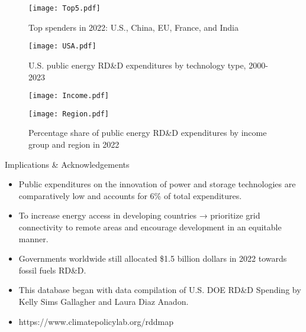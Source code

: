 \documentclass{beamer}
\begin{document}
\begin{frame}
\begin{figure}
    \centering
    \texttt{[image: Top5.pdf]}
    \caption{Top spenders in 2022: U.S., China, EU, France, and India 
}
    \label{fig:enter-label}
\end{figure}
\end{frame}

\begin{frame}
\begin{figure}
    \centering
    \texttt{[image: USA.pdf]}
    \caption{U.S. public energy RD\&D expenditures by technology type, 2000-2023
}
    \label{fig:enter-label}
\end{figure}
\end{frame}

\begin{frame}

\begin{figure}
 \centering
    \begin{minipage}{0.5\textwidth}
        \centering
        \texttt{[image: Income.pdf]} %
        
    \end{minipage}\hfill

    \begin{minipage}{0.5\textwidth}
        \centering
        \texttt{[image: Region.pdf]} %
       
    \end{minipage}
    \caption{Percentage share of public energy RD\&D expenditures by income group and region in 2022
}
\end{figure}
\end{frame}

\begin{frame}{Implications \& Acknowledgements}	
\begin{itemize} 
\item Public expenditures on the innovation of power and storage technologies are comparatively low and accounts for 6\% of total expenditures. \\
\item To increase energy access in developing countries → prioritize grid connectivity to remote areas and encourage development in an equitable manner. \\
\item Governments worldwide still allocated \$1.5 billion dollars in 2022 towards fossil fuels RD\&D.\\
\item This database began with data compilation of U.S. DOE RD\&D Spending by Kelly Sims Gallagher and Laura Diaz Anadon.\\
\item
https://www.climatepolicylab.org/rddmap\\

\end{itemize}
\end{frame}
\end{document}
